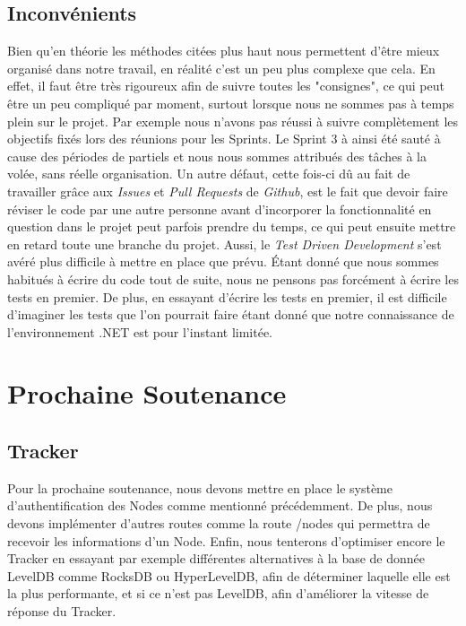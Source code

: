 \documentclass[11pt, a4paper]{report}
\begin{document}
    \subsection{Inconvénients}
      Bien qu'en théorie les méthodes citées plus haut nous permettent d'être mieux organisé dans notre travail, en réalité c'est un peu plus complexe que cela. En effet, il faut être très rigoureux afin de suivre toutes les "consignes", ce qui peut être un peu compliqué par moment, surtout lorsque nous ne sommes pas à temps plein sur le projet. Par exemple nous n'avons pas réussi à suivre complètement les objectifs fixés lors des réunions pour les Sprints. Le Sprint 3 à ainsi été sauté à cause des périodes de partiels et nous nous sommes attribués des tâches à la volée, sans réelle organisation.
      Un autre défaut, cette fois-ci dû au fait de travailler grâce aux \textit{Issues} et \textit{Pull Requests} de \textit{Github}, est le fait que devoir faire réviser le code par une autre personne avant d'incorporer la fonctionnalité en question dans le projet peut parfois prendre du temps, ce qui peut ensuite mettre en retard toute une branche du projet. Aussi, le \textit{Test Driven Development} s'est avéré plus difficile à mettre en place que prévu. Étant donné que nous sommes habitués à écrire du code tout de suite, nous ne pensons pas forcément à écrire les tests en premier. De plus, en essayant d'écrire les tests en premier, il est difficile d'imaginer les tests que l'on pourrait faire étant donné que notre connaissance de l'environnement .NET est pour l'instant limitée.
    
  \clearpage
  \section{Prochaine Soutenance}
    \subsection{Tracker}
      Pour la prochaine soutenance, nous devons mettre en place le système d'authentification des Nodes comme mentionné précédemment. De plus, nous devons implémenter d'autres routes comme la route /nodes qui permettra de recevoir les informations d'un Node. Enfin, nous tenterons d'optimiser encore le Tracker en essayant par exemple différentes alternatives à la base de donnée LevelDB comme RocksDB ou HyperLevelDB, afin de déterminer laquelle elle est la plus performante, et si ce n'est pas LevelDB, afin d'améliorer la vitesse de réponse du Tracker.
    
\end{document}
